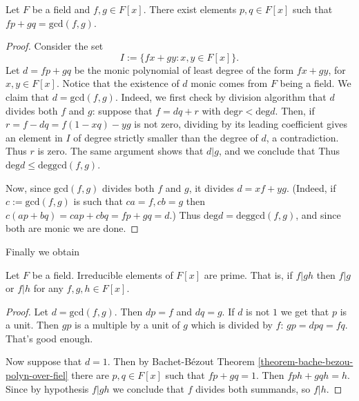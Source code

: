 \begin{theorem}
\label{theorem-bache-bezou-polyn-over-fiel}
\begin{reference}
\cite[Theorem 1.53]{MMST}
\end{reference}
Let $F$ be a field and $f,g\in F[x]$.
There exist elements  $p,q \in F[x]$ such
that $fp+gq=\text{gcd}(f,g)$.
\end{theorem}

\begin{proof}
Consider the set
$$
I:=\{fx+gy:x,y \in F[x]\}.
$$
Let $d=fp+gq$ be the monic polynomial of
least degree
of the form $fx+gy$, for $x,y \in F[x]$.
Notice that the existence of $d$ monic comes
from $F$ being a field.
We claim that $d=\text{gcd}(f,g)$.
Indeed, we first check by division algorithm
that $d$ divides both $f$ and $g$:
suppose that $f=dq+r$ with
$\text{deg}r<\text{deg}d$.
Then, if $r=f-dq=f(1-xq)-yg$ is not zero,
dividing by its leading coefficient gives an
element in $I$
of degree strictly smaller than the degree of
$d$, a contradiction.
Thus $r$ is zero. The same argument shows
that $d|g$, and we conclude that
Thus $\text{deg}d \leq
\text{deg}\text{gcd}(f,g)$.

Now, since
$\text{gcd}(f,g)$ divides both $f$ and $g$,
it divides $d=xf+yg$. (Indeed, if
$c:=\text{gcd}(f,g)$ is such that $ca=f,cb=g$
then $c(ap+bq)=cap+cbq=fp+gq=d$.)
Thus $\text{deg}d=\text{deg}\text{gcd}(f,g)$,
and since both are monic we are
done.
\end{proof}

Finally we obtain

\begin{lemma}
\label{lemma-irreducible-is-prime-in-F[x]}
Let $F$ be a field. Irreducible elements of
$F[x]$ are prime. That is, if $f|gh$
then $f|g$ or $f|h$ for any $f,g,h \in F[x]$.
\end{lemma}

\begin{proof}
Let $d=\text{gcd}(f,g)$. Then $dp=f$ and
$dq=g$. If $d$ is not $1$
we get that $p$ is a unit. Then $gp$ is a
multiple by a unit of $g$ which is
divided by $f$: $gp=dpq=fq$. That's good
enough.

Now suppose that $d=1$. Then by Bachet-Bézout
Theorem
\ref{theorem-bache-bezou-polyn-over-fiel}
there are $p,q \in F[x]$ such that $fp+gq=1$.
Then $fph+gqh=h$. Since by
hypothesis $f|gh$ we conclude that $f$
divides both summands, so $f|h$.
\end{proof}

